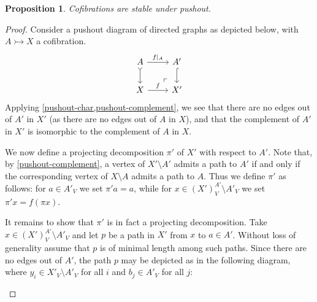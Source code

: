 \documentclass[11pt]{article}
\newtheorem{proposition}[theo]{Proposition}
\theoremstyle{definition}
\numberwithin{equation}{section}
\newcommand{\pushout}{\arrow [dr, phantom, "\ulcorner" very near end]}
\newcommand{\cto}{\rightarrowtail}
\begin{document}
\begin{proposition}\label{cof-pushout}
Cofibrations are stable under pushout.
\end{proposition}

\begin{proof}
Consider a pushout diagram of directed graphs as depicted below, with $A \cto X$ a cofibration.
\[
\begin{tikzcd}
A \arrow[r,"f|_A"] \arrow[d,tail] \pushout & A' \arrow[d,hook] \\
X \arrow[r,"f"] & X'
\end{tikzcd}
\]
Applying \cref{pushout-char,pushout-complement}, we see that there are no edges out of $A'$ in $X'$ (as there are no edges out of $A$ in $X$), and that the complement of $A'$ in $X'$ is isomorphic to the complement of $A$ in $X$.

We now define a projecting decomposition $\pi'$ of $X'$ with respect to $A'$. Note that, by \cref{pushout-complement}, a vertex of $X' \setminus A'$ admits a path to $A'$ if and only if the corresponding vertex of $X \setminus A$ admits a path to $A$. Thus we define $\pi'$ as follows: for $a \in A'_V$ we set $\pi' a = a$, while for $x \in (X')^{A'}_V \setminus A'_V$ we set $\pi' x = f(\pi x)$.

It remains to show that $\pi'$ is in fact a projecting decomposition. Take $x \in (X')_V^{A'}\setminus A'_V$ and let $p$ be a path in $X'$ from $x$ to $a \in A'$. Without loss of generality assume that $p$ is of minimal length among such paths. Since there are no edges out of $A'$, the path $p$ may be depicted as in the following diagram, where $y_i \in X'_V \setminus A'_V$ for all $i$ and $b_j \in A'_V$ for all $j$:

\begin{figure}[H]
    \centering
\end{figure}


\end{proof}
\end{document}
